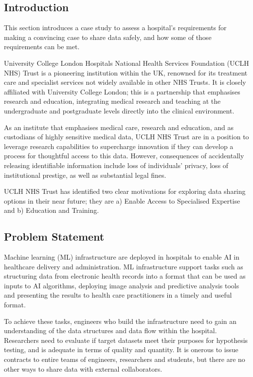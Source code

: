 \documentclass[11pt]{article}
\begin{document}
\subsection{Introduction}

This section introduces a case study to assess a hospital's requirements for making a convincing case to share data safely, and how some of those requirements can be met. 

University College London Hospitals National Health Services Foundation (UCLH NHS) Trust  is a pioneering institution within the UK, renowned for its treatment care and specialist services not widely available in other NHS Trusts. It is closely affiliated with University College London; this is a partnership that emphasises research and education, integrating medical research and teaching at the undergraduate and postgraduate levels directly into the clinical environment. 

As an institute that emphasises medical care, research and education, and as custodians of highly sensitive medical data, UCLH NHS Trust are in a position to leverage research capabilities to supercharge innovation if they can develop a process for thoughtful access to this data. However, consequences of accidentally releasing identifiable information include loss of individuals' privacy, loss of institutional prestige, as well as substantial legal fines.

UCLH NHS Trust has identified two clear motivations for exploring data sharing options in their near future; they are a) Enable Access to Specialised Expertise and b) Education and Training. 

\subsection{Problem Statement}

Machine learning (ML) infrastructure are deployed in hospitals to enable AI in healthcare delivery and administration. ML infrastructure support tasks such as structuring data from electronic health records into a format that can be used as inputs to AI algorithms, deploying image analysis and predictive analysis tools and presenting the results to health care practitioners in a timely and useful format.

To achieve these tasks, engineers who build the infrastructure need to gain an understanding of the data structures and data flow within the hospital. Researchers need to evaluate if target datasets meet their purposes for hypothesis testing, and is adequate in terms of quality and quantity. It is onerous to issue contracts to entire teams of engineers, researchers and students, but there are no other ways to share data with external collaborators. 
\end{document}
